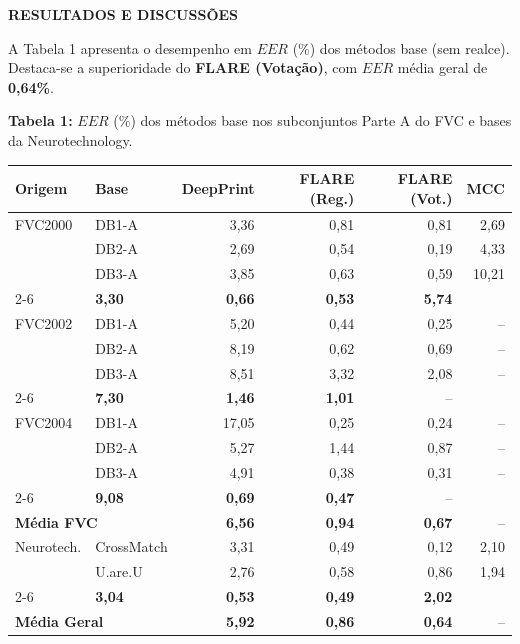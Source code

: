 \documentclass[12pt]{article}
\newcommand{\postersection}[1]{%
  {\noindent\fontsize{36pt}{41pt}\selectfont\textbf{#1}}\par%
  \vspace{0.18cm}%
}
\begin{document}
\begin{minipage}[t][89.8cm][s]{42.8cm}
  \fontsize{36pt}{41pt}\selectfont

  \postersection{RESULTADOS E DISCUSSÕES}
  A Tabela 1 apresenta o desempenho em $EER$ (\%) dos métodos base (sem realce). Destaca-se a superioridade do \textbf{FLARE (Votação)}, com $EER$ média geral de \textbf{0,64\%}.

  \vspace{0.12cm}
  \begin{center}
    \fontsize{24pt}{28pt}\selectfont
    {\textbf{Tabela 1:} $EER$ (\%) dos métodos base nos subconjuntos Parte A do FVC e bases da Neurotechnology.}\par
    \vspace{0.1cm}
    \renewcommand{\arraystretch}{1.03}
    \setlength{\tabcolsep}{5pt}
    \begin{tabular}{ll rrrr}
      \toprule
      \textbf{Origem} & \textbf{Base} & \textbf{DeepPrint} & \textbf{FLARE (Reg.)} & \textbf{FLARE (Vot.)} & \textbf{MCC} \\
      \midrule
      FVC2000 & DB1-A & 3,36 & 0,81 & 0,81 & 2,69 \\
       & DB2-A & 2,69 & 0,54 & 0,19 & 4,33 \\
       & DB3-A & 3,85 & 0,63 & 0,59 & 10,21 \\
      \cmidrule{2-6}
      \multicolumn{2}{l}{\textbf{Média FVC2000}} & \textbf{3,30} & \textbf{0,66} & \textbf{0,53} & \textbf{5,74} \\
      \midrule
      FVC2002 & DB1-A & 5,20 & 0,44 & 0,25 & -- \\
       & DB2-A & 8,19 & 0,62 & 0,69 & -- \\
       & DB3-A & 8,51 & 3,32 & 2,08 & -- \\
      \cmidrule{2-6}
      \multicolumn{2}{l}{\textbf{Média FVC2002}} & \textbf{7,30} & \textbf{1,46} & \textbf{1,01} & -- \\
      \midrule
      FVC2004 & DB1-A & 17,05 & 0,25 & 0,24 & -- \\
       & DB2-A & 5,27 & 1,44 & 0,87 & -- \\
       & DB3-A & 4,91 & 0,38 & 0,31 & -- \\
      \cmidrule{2-6}
      \multicolumn{2}{l}{\textbf{Média FVC2004}} & \textbf{9,08} & \textbf{0,69} & \textbf{0,47} & -- \\
      \midrule
      \multicolumn{2}{l}{\textbf{Média FVC}} & \textbf{6,56} & \textbf{0,94} & \textbf{0,67} & -- \\
      \midrule
      Neurotech. & CrossMatch & 3,31 & 0,49 & 0,12 & 2,10 \\
       & U.are.U & 2,76 & 0,58 & 0,86 & 1,94 \\
      \cmidrule{2-6}
      \multicolumn{2}{l}{\textbf{Média Neurotech.}} & \textbf{3,04} & \textbf{0,53} & \textbf{0,49} & \textbf{2,02} \\
      \midrule[\heavyrulewidth]
      \multicolumn{2}{l}{\textbf{Média Geral}} & \textbf{5,92} & \textbf{0,86} & \textbf{0,64} & -- \\
      \bottomrule
    \end{tabular}
  \end{center}


\end{minipage}
\end{document}
